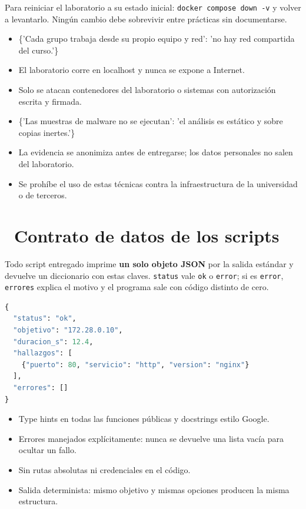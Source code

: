 \documentclass[11pt,a4paper]{article}
\newcommand{\iconotexto}[2]{\textcolor{cyanNeon}{\faIcon{#1}}~#2}
\begin{document}
\begin{cajaRecuerda}Para reiniciar el laboratorio a su estado inicial: \texttt{docker compose down -v} y volver a levantarlo. Ningún cambio debe sobrevivir entre prácticas sin documentarse.
\end{cajaRecuerda}

\begin{itemize}[leftmargin=1.4em,itemsep=2pt,topsep=3pt]
  \item \{'Cada grupo trabaja desde su propio equipo y red': 'no hay red compartida del curso.'\}
  \item El laboratorio corre en localhost y nunca se expone a Internet.
  \item Solo se atacan contenedores del laboratorio o sistemas con autorización escrita y firmada.
  \item \{'Las muestras de malware no se ejecutan': 'el análisis es estático y sobre copias inertes.'\}
  \item La evidencia se anonimiza antes de entregarse; los datos personales no salen del laboratorio.
  \item Se prohíbe el uso de estas técnicas contra la infraestructura de la universidad o de terceros.
\end{itemize}

\section{\iconotexto{code}{Contrato de datos de los scripts}}

\begin{cajaConcepto}Todo script entregado imprime \textbf{un solo objeto JSON} por la salida estándar y devuelve un diccionario con estas claves. \texttt{status} vale \texttt{ok} o \texttt{error}; si es \texttt{error}, \texttt{errores} explica el motivo y el programa sale con código distinto de cero.
\begin{lstlisting}[language=Python,style=estiloPython]
{
  "status": "ok",
  "objetivo": "172.28.0.10",
  "duracion_s": 12.4,
  "hallazgos": [
    {"puerto": 80, "servicio": "http", "version": "nginx"}
  ],
  "errores": []
}
\end{lstlisting}
\end{cajaConcepto}

\begin{itemize}[leftmargin=1.4em,itemsep=2pt,topsep=3pt]
  \item Type hints en todas las funciones públicas y docstrings estilo Google.
  \item Errores manejados explícitamente: nunca se devuelve una lista vacía para ocultar un fallo.
  \item Sin rutas absolutas ni credenciales en el código.
  \item Salida determinista: mismo objetivo y mismas opciones producen la misma estructura.
\end{itemize}
\end{document}
